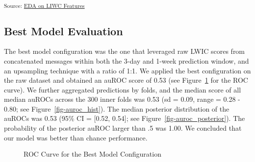 \documentclass[
  letterpaper,
  DIV=11,
  numbers=noendperiod]{scrartcl}
\begin{document}
\textsubscript{Source:
\href{https://jjcurtin.github.io/study_messages/notebooks/fig_eda_liwc-preview.html\#cell-fig-liwc_cat_norm}{EDA
on LIWC Features}}

\subsection{Best Model Evaluation}\label{best-model-evaluation}

The best model configuration was the one that leveraged raw LWIC scores
from concatenated messages within both the 3-day and 1-week prediction
window, and an upsampling technique with a ratio of 1:1. We applied the
best configuration on the raw dataset and obtained an auROC score of
0.53 (see Figure~\ref{fig-auroc} for the ROC curve). We further
aggregated predictions by folds, and the median score of all median
auROCs across the 300 inner folds was 0.53 (sd = 0.09, range = 0.28 -
0.80; see Figure~\ref{fig-auroc_hist}). The median posterior
distribution of the auROCs was 0.53 (95\% CI = {[}0.52, 0.54{]}; see
Figure~\ref{fig-auroc_posterior}). The probability of the posterior
auROC larger than .5 was 1.00. We concluded that our model was better
than chance performance.

\begin{figure}[H]


\caption{\label{fig-auroc}ROC Curve for the Best Model Configuration}

\end{figure}%
\end{document}
